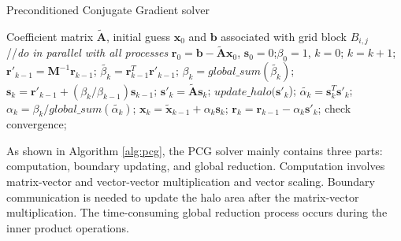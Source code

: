 \documentclass{sig-alternate}
\begin{document}
\begin{algorithm}[!t]
\caption{Preconditioned Conjugate Gradient solver}
\label{alg:pcg}
\begin{algorithmic}[1]
\REQUIRE Coefficient matrix $\tilde{\textbf{A}}$, initial guess $\textbf{x}_0$ and $\textbf{b}$ associated with grid block $B_{i,j}$ \\
//\qquad    \textit{do in parallel with all processes}
\STATE $\textbf{r}_0 = \textbf{b}-\tilde{\textbf{A}}\textbf{x}_0$, $\textbf{s}_0 =0$;\quad $\beta_0=1$, $k=0$;
\STATE $k=k+1$;
\STATE $\textbf{r}'_{k-1} =\textbf{M}^{-1}\textbf{r}_{k-1}$; \label{pcg_scale1} 
\STATE $\tilde{\beta_k} = \textbf{r}_{k-1}^T\textbf{r}'_{k-1}$;\label{pcg_dot1}
\STATE $\beta_k = global\_sum(\tilde{\beta_k})$;\label{pcg_global1} 
\STATE $\textbf{s}_k = \textbf{r}'_{k-1} +(\beta_k/\beta_{k-1})\textbf{s}_{k-1}$;\label{pcg_scale2}
\STATE $\textbf{s}'_k = \tilde{\textbf{A}}\textbf{s}_k$; \label{pcg_mat}
\STATE $update\_halo(\textbf{s}'_k$); 
\STATE $\tilde{\alpha_k} = \textbf{s}_k^T\textbf{s}'_k$;\label{pcg_dot2}
\STATE $\alpha_k =\beta_k/ global\_sum(\tilde{\alpha_k})$;\quad \label{pcg_global2}
\STATE $\textbf{x}_k =\tilde{\textbf{x}}_{k-1} +\alpha_k \textbf{s}_k$;\label{pcg_scale3}
\STATE $\textbf{r}_k =\textbf{r}_{k-1} -\alpha_k\textbf{s}'_k$;\label{pcg_scale4}
\STATE check convergence;
\ENDIF
\ENDWHILE
\end{algorithmic}
\end{algorithm}


As shown in Algorithm \ref{alg:pcg}, the PCG solver mainly contains three parts: computation, boundary updating, and global reduction. Computation involves matrix-vector and vector-vector multiplication and vector scaling.  Boundary communication is needed to update the halo area after the matrix-vector multiplication.  The time-consuming global reduction process occurs during the inner product operations.

\end{document}
